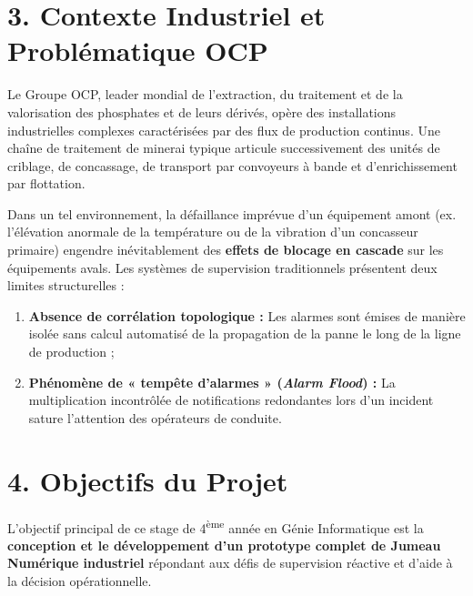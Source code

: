 \section*{3. Contexte Industriel et Problématique OCP}

Le Groupe OCP, leader mondial de l'extraction, du traitement et de la valorisation des phosphates et de leurs dérivés, opère des installations industrielles complexes caractérisées par des flux de production continus. Une chaîne de traitement de minerai typique articule successivement des unités de criblage, de concassage, de transport par convoyeurs à bande et d'enrichissement par flottation.

Dans un tel environnement, la défaillance imprévue d'un équipement amont (ex. l'élévation anormale de la température ou de la vibration d'un concasseur primaire) engendre inévitablement des \textbf{effets de blocage en cascade} sur les équipements avals. Les systèmes de supervision traditionnels présentent deux limites structurelles :
\begin{enumerate}
    \item \textbf{Absence de corrélation topologique :} Les alarmes sont émises de manière isolée sans calcul automatisé de la propagation de la panne le long de la ligne de production ;
    \item \textbf{Phénomène de « tempête d'alarmes » (\textit{Alarm Flood}) :} La multiplication incontrôlée de notifications redondantes lors d'un incident sature l'attention des opérateurs de conduite.
\end{enumerate}

\section*{4. Objectifs du Projet}

L'objectif principal de ce stage de 4\textsuperscript{ème} année en Génie Informatique est la \textbf{conception et le développement d'un prototype complet de Jumeau Numérique industriel} répondant aux défis de supervision réactive et d'aide à la décision opérationnelle.

